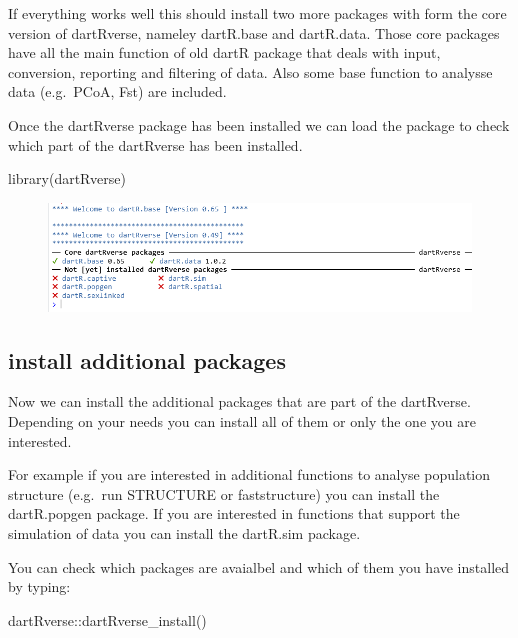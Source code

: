 \documentclass[
  letterpaper,
  DIV=11,
  numbers=noendperiod]{scrreprt}
\newenvironment{Shaded}{\begin{snugshade}}{\end{snugshade}}
\newcommand{\FunctionTok}[1]{\textcolor[rgb]{0.02,0.16,0.49}{#1}}
\newcommand{\NormalTok}[1]{\textcolor[rgb]{0.00,0.44,0.13}{#1}}
\newcommand{\SpecialCharTok}[1]{\textcolor[rgb]{0.25,0.44,0.63}{#1}}
\begin{document}
If everything works well this should install two more packages with form
the core version of dartRverse, nameley dartR.base and dartR.data. Those
core packages have all the main function of old dartR package that deals
with input, conversion, reporting and filtering of data. Also some base
function to analysse data (e.g.~PCoA, Fst) are included.

Once the dartRverse package has been installed we can load the package
to check which part of the dartRverse has been installed.

\begin{Shaded}
\begin{Highlighting}[]
\FunctionTok{library}\NormalTok{(dartRverse)}
\end{Highlighting}
\end{Shaded}

\begin{figure}

\includegraphics{images/dartRverse.png} \hfill{}

\end{figure}

\hypertarget{install-additional-packages}{%
\subsection*{install additional
packages}\label{install-additional-packages}}

Now we can install the additional packages that are part of the
dartRverse. Depending on your needs you can install all of them or only
the one you are interested.

For example if you are interested in additional functions to analyse
population structure (e.g.~run STRUCTURE or faststructure) you can
install the dartR.popgen package. If you are interested in functions
that support the simulation of data you can install the dartR.sim
package.

You can check which packages are avaialbel and which of them you have
installed by typing:

\begin{Shaded}
\begin{Highlighting}[]
\NormalTok{dartRverse}\SpecialCharTok{::}\FunctionTok{dartRverse\_install}\NormalTok{()}
\end{Highlighting}
\end{Shaded}
\end{document}
